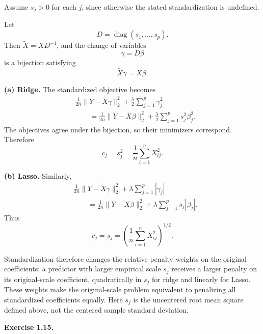 \documentclass[answers,12pt,addpoints]{exam}
\begin{document}
\begin{questions}

\begin{solution}

Assume $s_j>0$ for each $j$, since otherwise the stated
standardization is undefined.

Let
\[
D=\operatorname{diag}(s_1,\ldots,s_p).
\]
Then $\widetilde X=XD^{-1}$, and the change of variables
\[
\gamma=D\beta
\]
is a bijection satisfying
\[
\widetilde X\gamma=X\beta.
\]

\textbf{(a) Ridge.}
The standardized objective becomes
\begin{align*}
&
\frac1{2n}\|Y-\widetilde X\gamma\|_2^2
+\frac{\lambda}{2}\sum_{j=1}^p\gamma_j^2\\
&\qquad=
\frac1{2n}\|Y-X\beta\|_2^2
+\frac{\lambda}{2}\sum_{j=1}^p s_j^2\beta_j^2.
\end{align*}
The objectives agree under the bijection, so their minimizers
correspond. Therefore
\[
\boxed{
c_j=s_j^2=\frac1n\sum_{i=1}^nX_{ij}^2.
}
\]

\textbf{(b) Lasso.}
Similarly,
\begin{align*}
&
\frac1{2n}\|Y-\widetilde X\gamma\|_2^2
+\lambda\sum_{j=1}^p|\gamma_j|\\
&\qquad=
\frac1{2n}\|Y-X\beta\|_2^2
+\lambda\sum_{j=1}^p s_j|\beta_j|.
\end{align*}
Thus
\[
\boxed{
c_j=s_j
=
\left(\frac1n\sum_{i=1}^nX_{ij}^2\right)^{1/2}.
}
\]

Standardization therefore changes the relative penalty weights
on the original coefficients: a predictor with larger empirical
scale $s_j$ receives a larger penalty on its original-scale
coefficient, quadratically in $s_j$ for ridge and linearly for Lasso.
These weights make the original-scale problem equivalent to
penalizing all standardized coefficients equally.
Here $s_j$ is the uncentered root mean square defined above, not
the centered sample standard deviation.

\end{solution}

\question \textbf{Exercise 1.15.}

\begin{parts}


\end{parts}
\end{questions}
\end{document}
